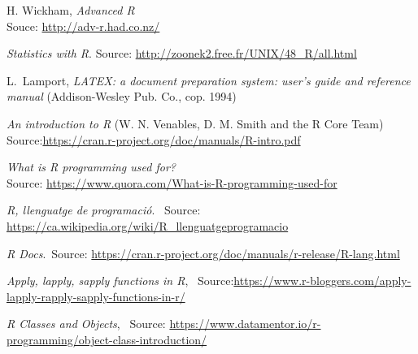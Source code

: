 \documentclass[12pt]{article}
\begin{document}
\newpage
\begin{thebibliography}{100}


H. Wickham, \textit{Advanced R} \\ Souce: \url{http://adv-r.had.co.nz/}


\textit{Statistics with R}. Source: \url{http://zoonek2.free.fr/UNIX/48_R/all.html}

L.\ Lamport, \textit{LATEX: a document preparation system: user's guide and reference manual} (Addison-Wesley Pub. Co., cop. 1994)

\textit{An introduction to R} (W. N. Venables, D. M. Smith
and the R Core Team) Source:\url{https://cran.r-project.org/doc/manuals/R-intro.pdf}

\textit{What is R programming used for?} \\ Source: \url{https://www.quora.com/What-is-R-programming-used-for}

\textit{R, llenguatge de programació}. \ Source: \url{https://ca.wikipedia.org/wiki/R_llenguatgeprogramacio}

\textit{R Docs}.\ Source: \url{https://cran.r-project.org/doc/manuals/r-release/R-lang.html}

\textit{Apply, lapply, sapply functions in R}, \ Source:\url{https://www.r-bloggers.com/apply-lapply-rapply-sapply-functions-in-r/}

\textit{R Classes and Objects}, \ Source: \url{https://www.datamentor.io/r-programming/object-class-introduction/}

\end{thebibliography}
\end{document}
